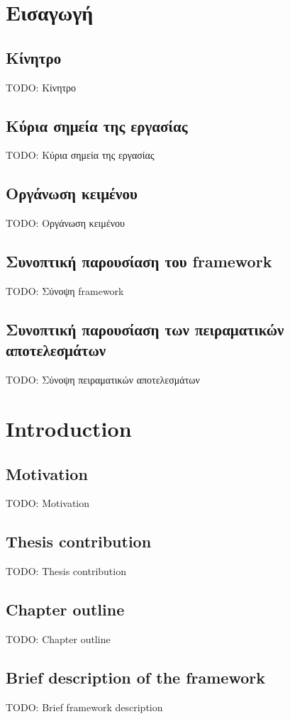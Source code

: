 
\chapter{Εισαγωγή}

\section{Κίνητρο}
  TODO: Κίνητρο

\section{Κύρια σημεία της εργασίας}
  TODO: Κύρια σημεία της εργασίας

\section{Οργάνωση κειμένου}
  TODO: Οργάνωση κειμένου

\section{Συνοπτική παρουσίαση του framework}
  TODO: Σύνοψη framework

\section{Συνοπτική παρουσίαση των πειραματικών αποτελεσμάτων}
  TODO: Σύνοψη πειραματικών αποτελεσμάτων

\setcounter{chapter}{0}

\chapter{Introduction}

\section{Motivation}
  TODO: Motivation

\section{Thesis contribution}
  TODO: Thesis contribution

\section{Chapter outline}
  TODO: Chapter outline

\section{Brief description of the framework}
  TODO: Brief framework description
